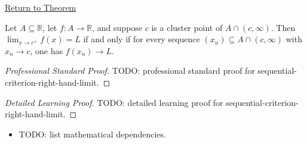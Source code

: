 \newpage
{}
\label{prf:sequential-criterion-right-hand-limit}

\begin{remark*}[Return]
\hyperref[thm:sequential-criterion-right-hand-limit]{Return to Theorem}
\end{remark*}

\begin{theorem*}
Let $A\subseteq\mathbb{R}$, let $f:A\to\mathbb{R}$, and suppose $c$ is a
cluster point of $A\cap(c,\infty)$. Then $\lim_{x\to c^+}f(x)=L$ if and
only if for every sequence $(x_n)\subseteq A\cap(c,\infty)$ with
$x_n\to c$, one has $f(x_n)\to L$.

\smallskip\noindent
\end{theorem*}

\begin{proof}[Professional Standard Proof]
\LRAProofBodyStart
TODO: professional standard proof for sequential-criterion-right-hand-limit.
\end{proof}

\begin{proof}[Detailed Learning Proof]
\LRAProofBodyStart
TODO: detailed learning proof for sequential-criterion-right-hand-limit.
\end{proof}

\begin{remark*}
\end{remark*}

\begin{dependencies}
\begin{itemize}
  \item TODO: list mathematical dependencies.
\end{itemize}
\end{dependencies}

\clearpage
